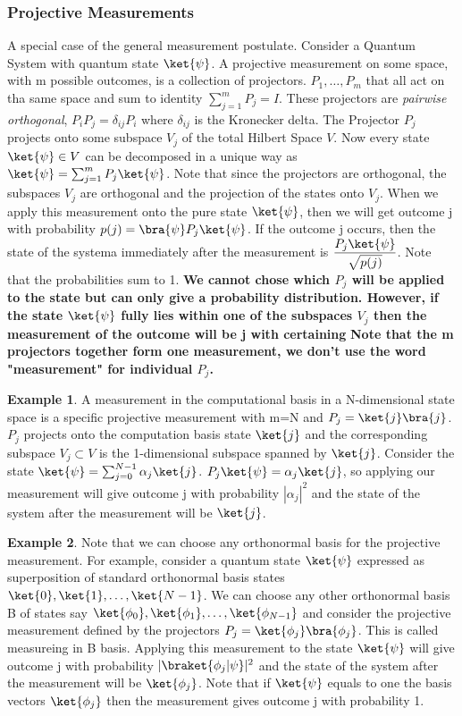 \documentclass[12pt, oneside]{book}
\theoremstyle{definition}
\theoremstyle{definition}
\newtheorem{example}{Example}[section]
\theoremstyle{remark}
\begin{document}
\subsubsection{Projective Measurements}
A special case of the general measurement postulate. Consider a Quantum System with quantum state $\ket{\psi}$. A projective measurement on some space, with m possible outcomes, is a collection of projectors.
$P_1,\ldots,P_m$ that all act on tha same space and sum to identity $\sum_{j=1}^m P_j=I$. These projectors are \textit{pairwise orthogonal},
$P_iP_j=\delta_{ij}P_i$ where $\delta_{ij}$ is the Kronecker delta. The Projector $P_j$ projects onto some subspace $V_j$ of the total Hilbert Space $V$. 
Now every state $\ket{\psi} \in V$ can be decomposed in a unique way as $\ket{\psi}=\sum_{j=1}^m P_j\ket{\psi}$. Note that since the projectors
are orthogonal, the subspaces $V_j$ are orthogonal and the projection of the states onto $V_j$. When we apply this measurement onto the pure
state $\ket{\psi}$, then we will get outcome j with probability $p(j)=\bra{\psi}P_j\ket{\psi}$. If the outcome j occurs, then the state of the systema
immediately after the measurement is $\dfrac{P_j\ket{\psi}}{\sqrt{p(j)}}$. Note that the probabilities sum to 1.
\textbf{We cannot chose which $P_j$ will be applied to the state but can only give a probability distribution. However, if the state $\ket{\psi}$ fully lies within
one of the subspaces $V_j$ then the measurement of the outcome will be j with certaining}
\textbf{Note that the m projectors together form one measurement, we don't use the word "measurement" for individual $P_j$.}
\begin{example}
    A measurement in the computational basis in a N-dimensional state space is a specific projective measurement
    with m=N and $P_j=\ket{j}\bra{j}$. $P_j$ projects onto the computation basis state $\ket{j}$ and the corresponding
    subspace $V_j \subset V$  is the 1-dimensional subspace spanned by $\ket{j}$. 
    Consider the state $\ket{\psi} = \sum_{j=0}^{N-1} \alpha_j \ket{j}$. $P_j\ket{\psi}=\alpha_j\ket{j}$, so applying our measurement
    will give outcome j with probability $|\alpha_j|^2$ and the state of the system after the measurement will be $\ket{j}$.
\end{example}


\begin{example}
    Note that we can choose any orthonormal basis for the projective measurement. For example, consider
    a quantum state $\ket{\psi}$ expressed as superposition of standard orthonormal basis states $\ket{0},\ket{1},\ldots,\ket{N-1}$. 
    We can choose any other orthonormal basis B of states say $\ket{\phi_0},\ket{\phi_1},\ldots,\ket{\phi_{N-1}}$
    and consider the projective measurement defined by the projectors $P_j=\ket{\phi_j}\bra{\phi_j}$.
    This is called measureing in B basis. Applying this measurement to the state $\ket{\psi}$ will give 
    outcome j with probability $|\braket{\phi_j|\psi}|^2$ and the state of the system after the measurement will be $\ket{\phi_j}$.
    Note that if $\ket{\psi}$ equals to one the basis vectors $\ket{\phi_j}$ then the measurement
    gives outcome j with probability 1.
\end{example}
\end{document}
